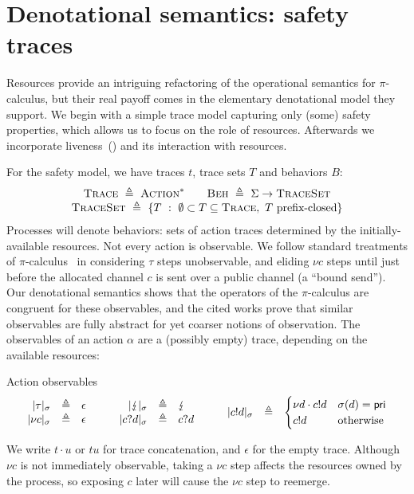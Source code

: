 \documentclass{entcs}
\begin{document}
\section{Denotational semantics: safety traces}
\label{sec:safety}



Resources provide an intriguing refactoring of the operational
semantics for $\pi$-calculus, but their real payoff comes in the
elementary denotational model they support.  We begin with a simple
trace model capturing only (some) safety properties, which allows us
to focus on the role of resources.  Afterwards we incorporate
liveness~() and its interaction with resources.

For the safety model, we have traces $t$, trace sets $T$ and behaviors
$B$:
\[
\begin{array}{c}
\textsc{Trace}
  \ \eqdef\ 
  \textsc{Action}^*
\qquad
\textsc{Beh}
  \ \eqdef\ 
  \Sigma \ra \textsc{TraceSet}
\\
\textsc{TraceSet} 
  \ \eqdef\ 
  \{ T\ :\ \emptyset \subset T \subseteq \textsc{Trace},\ T\ \textrm{prefix-closed} \}
\end{array}
\]
Processes will denote behaviors: sets of action traces determined by
the initially-available resources.  Not every action is observable.
We follow standard treatments of
$\pi$-calculus~\cite{Sangiorgi2001,Hennessy2002} in considering $\tau$
steps unobservable, and eliding $\nu c$ steps until just before the
allocated channel $c$ is sent over a public channel (a ``bound
send'').  Our denotational semantics shows that the operators of the
$\pi$-calculus are congruent for these observables, and the cited
works prove that similar observables are fully abstract for yet
coarser notions of observation.  The observables of an action $\alpha$
are a (possibly empty) trace, depending on the available resources:
\begin{display}
[$|\alpha|_\sigma : \textsc{Trace}$]
{Action observables}
\[
\begin{array}{rcl}
  |\tau|_\sigma &\triangleq& \epsilon \\
  |\nu c|_\sigma &\triangleq& \epsilon
\end{array} \qquad
\begin{array}{rcl}
  |\lightning|_\sigma &\triangleq& \lightning \\
  |c?d|_\sigma &\triangleq& c?d 
\end{array} \qquad
\begin{array}{rcl}
  |c!d|_\sigma &\triangleq& 
    \begin{cases}
      \nu d \cdot c!d & \sigma(d) = \textsf{pri} \\
      c!d & \textrm{otherwise}
    \end{cases} 
\end{array}
\]
\end{display}
We write $t \cdot u$ or $tu$ for trace concatenation, and $\epsilon$
for the empty trace.  Although $\nu c$ is not immediately observable,
taking a $\nu c$ step affects the resources owned by the process, so
exposing $c$ later will cause the $\nu c$ step to reemerge.
\end{document}
